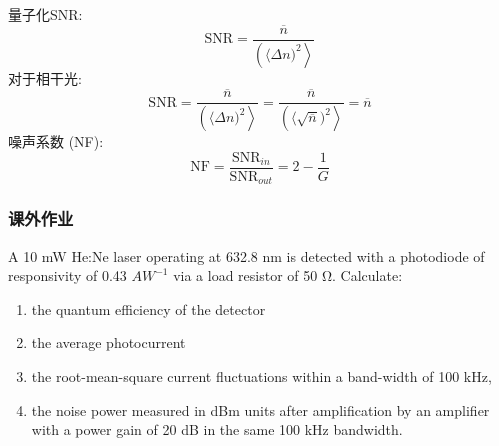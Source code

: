 \begin{frame} 
 \frametitle{}
    量子化SNR: 
    \[\text{SNR}= \frac{\overline{n}}{\left (\langle \Delta n)^2 \right\rangle}  \]
    对于相干光:
    \[\text{SNR}= \frac{\overline{n}}{\left (\langle \Delta n)^2 \right\rangle} = \frac{\overline{n}}{\left (\langle \sqrt{\overline{n}})^2 \right\rangle} = \overline{n}\]  
    噪声系数 (NF): 
    \[\text{NF}=\frac{\text{SNR}_{in}}{\text{SNR}_{out}} = 2-\frac{1}{G} \]
\end{frame}

\begin{frame} 
    \frametitle{课外作业}
    A 10 mW He:Ne laser operating at 632.8 nm is detected with a photodiode of responsivity of 0.43 $AW^{−1}$ via a load resistor of 50 Ω. Calculate:
    \begin{enumerate}
        \item the quantum efficiency of the detector
        \item the average photocurrent
        \item the root-mean-square current fluctuations within a band-width of 100 kHz,
        \item  the noise power measured in dBm units after amplification by an
        amplifier with a power gain of 20 dB in the same 100 kHz bandwidth.
    \end{enumerate}
\end{frame}
